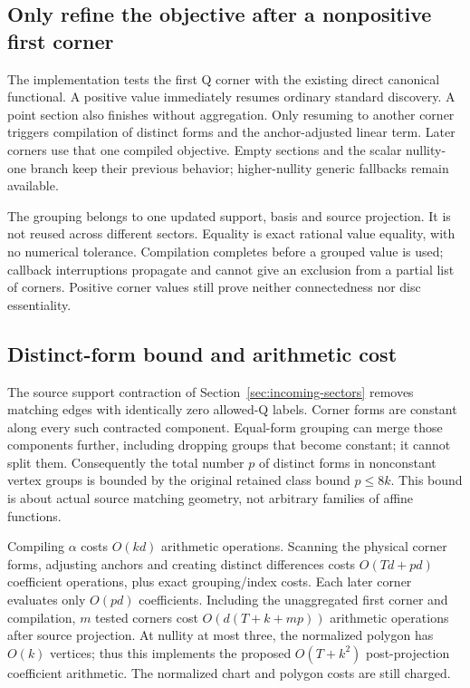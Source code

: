 \subsection{Only refine the objective after a nonpositive first corner}

The implementation tests the first Q corner with the existing direct
canonical functional. A positive value immediately resumes ordinary
standard discovery. A point section also finishes without aggregation.
Only resuming to another corner triggers compilation of distinct forms
and the anchor-adjusted linear term. Later corners use that one compiled
objective. Empty sections and the scalar nullity-one branch keep their
previous behavior; higher-nullity generic fallbacks remain available.

The grouping belongs to one updated support, basis and source projection.
It is not reused across different sectors. Equality is exact rational
value equality, with no numerical tolerance. Compilation completes before
a grouped value is used; callback interruptions propagate and cannot give
an exclusion from a partial list of corners. Positive corner values still
prove neither connectedness nor disc essentiality.

\subsection{Distinct-form bound and arithmetic cost}

The source support contraction of Section~\ref{sec:incoming-sectors} removes matching
edges with identically zero allowed-Q labels. Corner forms are constant
along every such contracted component. Equal-form grouping can merge those
components further, including dropping groups that become constant; it
cannot split them. Consequently the total number $p$ of distinct forms in
nonconstant vertex groups is bounded by the original retained class bound
$p\le8k$. This bound is about actual source matching geometry, not arbitrary
families of affine functions.

Compiling $\alpha$ costs $O(kd)$ arithmetic operations. Scanning the physical
corner forms, adjusting anchors and creating distinct differences costs
$O(Td+pd)$ coefficient operations, plus exact grouping/index costs.
Each later corner evaluates only $O(pd)$ coefficients. Including the
unaggregated first corner and compilation, $m$ tested corners cost
$O(d(T+k+mp))$ arithmetic operations after source projection. At nullity
at most three, the normalized polygon has $O(k)$ vertices; thus this
implements the proposed $O(T+k^2)$ post-projection coefficient arithmetic.
The normalized chart and polygon costs are still charged.

